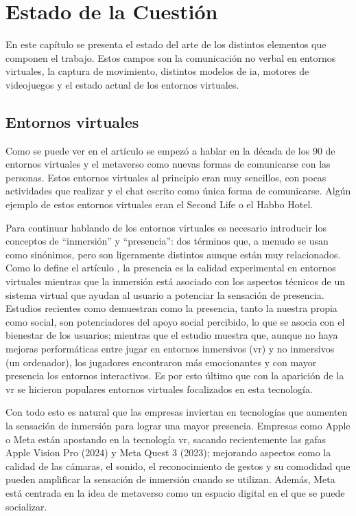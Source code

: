 \chapter{Estado de la Cuestión}
\label{cap:estadoDeLaCuestion}
En este capítulo se presenta el estado del arte de los distintos elementos que componen el trabajo. Estos campos son la comunicación no verbal en entornos virtuales, la captura de movimiento, distintos modelos de \gls{ia}, motores de videojuegos y el estado actual de los entornos virtuales.

\section{Entornos virtuales}
Como se puede ver en el artículo \cite{NOVE} se empezó a hablar en la década de los 90 de entornos virtuales y el \gls{metaverso} como nuevas formas de comunicarse con las personas.
Estos entornos virtuales al principio eran muy sencillos, con pocas actividades que realizar y el chat escrito como única forma de comunicarse. Algún ejemplo de estos entornos virtuales eran el Second Life o el Habbo Hotel.

Para continuar hablando de los entornos virtuales es necesario introducir los conceptos de ``inmersión'' y ``presencia'': dos términos que, a menudo se usan como sinónimos, pero son ligeramente distintos aunque están muy relacionados.
Como lo define el artículo \cite{MRPI}, la presencia es la calidad experimental en entornos virtuales mientras que la inmersión está asociado con los aspectos técnicos de un sistema virtual que ayudan al usuario a potenciar la sensación de presencia.
Estudios recientes como \cite{FPPS} demuestran como la presencia, tanto la nuestra propia como social, son potenciadores del apoyo social percibido, lo que se asocia con el bienestar de los usuarios; mientras que el estudio \cite{GVR} muestra que, aunque no haya mejoras performáticas entre jugar en entornos inmersivos (\gls{vr}) y no inmersivos (un ordenador), los jugadores encontraron más emocionantes y con mayor presencia los entornos interactivos.
Es por esto último que con la aparición de la \gls{vr} se hicieron populares entornos virtuales focalizados en esta tecnología.

Con todo esto es natural que las empresas inviertan en tecnologías que aumenten la sensación de inmersión para lograr una mayor presencia.
Empresas como Apple o Meta están apostando en la tecnología \gls{vr}, sacando recientemente las gafas Apple Vision Pro (2024) y Meta Quest 3 (2023); mejorando aspectos como la calidad de las cámaras, el sonido, el reconocimiento de gestos y su comodidad que pueden amplificar la sensación de inmersión cuando se utilizan.
Además, Meta está centrada en la idea de \gls{metaverso} como un espacio digital en el que se puede socializar.

